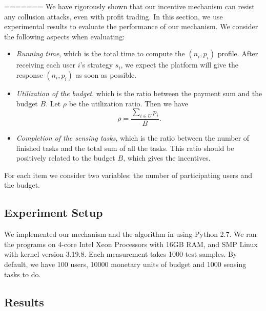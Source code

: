 \documentclass[conference]{IEEEtran}
\theoremstyle{definition}
\begin{document}
{%
=======
We have rigorously shown that our incentive mechanism can resist any collusion attacks, even with profit trading. In this section, we use experimental results to evaluate the performance of our mechanism. We consider the following aspects when evaluating: 
\begin{itemize}
\item \emph{Running time}, which is the total time to compute the $(n_i,p_i)$ profile. After receiving each user $i$'s strategy $s_i$, we expect the platform will give the response $(n_i,p_i)$ as soon as possible.
\item \emph{Utilization of the budget}, which is the ratio between the payment sum and the budget $B$. Let $\rho$ be the utilization ratio. Then we have
\begin{equation}
\label{eqn:ur}
\rho = \frac{\sum_{i\in U}p_i}{B}.
\end{equation}
\item \emph{Completion of the sensing tasks}, which is the ratio between the number of finished tasks and the total sum of all the tasks. This ratio should be positively related to the budget $B$, which gives the incentives.
\end{itemize}
For each item we consider two variables: the number of participating users and the budget.

\subsection{Experiment Setup}
We implemented our mechanism and the algorithm in \cite{koutsopoulos2013optimal} using Python 2.7. We ran the programs on 4-core Intel Xeon Processors with 16GB RAM, and SMP Linux with kernel version 3.19.8. Each measurement takes 1000 test samples. By default, we have 100 users, 10000 monetary units of budget and 1000 sensing tasks to do.

\subsection{Results}

}
\end{document}
